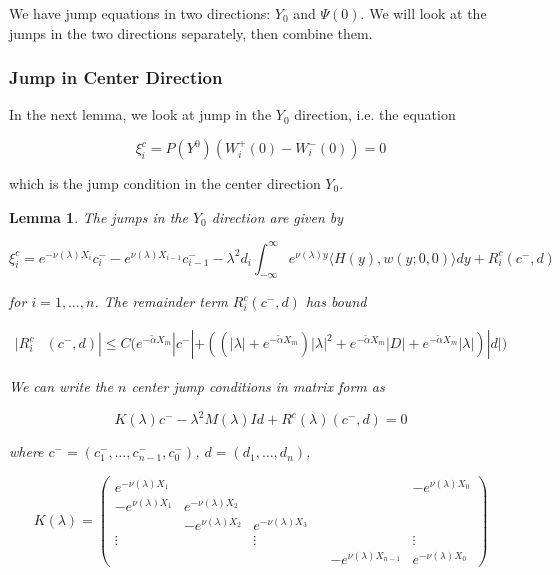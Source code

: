 \documentclass[12pt]{article}
\newtheorem{lemma}{Lemma}
\begin{document}
We have jump equations in two directions: $Y_0$ and $\Psi(0)$. We will look at the jumps in the two directions separately, then combine them.

\subsubsection{Jump in Center Direction}

In the next lemma, we look at jump in the $Y_0$ direction, i.e. the equation

\[
\xi^c_i = P(Y^0) ( W_i^+(0) - W_i^-(0) ) = 0
\]

which is the jump condition in the center direction $Y_0$.

\begin{lemma}

The jumps in the $Y_0$ direction are given by 

\begin{equation}
\xi^c_i 
= e^{-\nu(\lambda)X_i} c_i^- - e^{\nu(\lambda)X_{i-1}} c_{i-1}^- - \lambda^2 d_i \int_{-\infty}^\infty e^{\nu(\lambda)y}  \langle H(y), w(y; 0, 0) \rangle dy + R^c_i(c^-,d)
\end{equation}

for $i = 1, \dots, n$. The remainder term $R^c_i(c^-,d)$ has bound

\begin{align}
|R^c_i&(c^-,d)| \leq C \Big( e^{-\tilde{\alpha} X_m} |c^-| + ((|\lambda| + e^{-\tilde{\alpha} X_m})|\lambda|^2 + e^{-\tilde{\alpha} X_m}|D| + e^{-\tilde{\alpha} X_m} |\lambda| ) |d| \Big)
\end{align}

We can write the $n$ center jump conditions in matrix form as

\begin{equation}
K(\lambda)c^- -\lambda^2 M(\lambda) I d + R^c(\lambda)(c^-,d) = 0
\end{equation}

where $c^- = (c_1^-, \dots, c_{n-1}^-, c_0^-)$, $d = (d_1, \dots, d_n)$, 

\begin{equation}
K(\lambda) = 
\begin{pmatrix}
e^{-\nu(\lambda)X_1} & & & & & -e^{\nu(\lambda)X_0} \\
-e^{\nu(\lambda)X_1} & e^{-\nu(\lambda)X_2} \\
& -e^{\nu(\lambda)X_2} & e^{-\nu(\lambda)X_3} \\
\vdots & & \vdots & &&  \vdots \\
& & & & -e^{\nu(\lambda)X_{n-1}} & e^{-\nu(\lambda)X_0} 
\end{pmatrix}
\end{equation}


\end{lemma}
\end{document}
